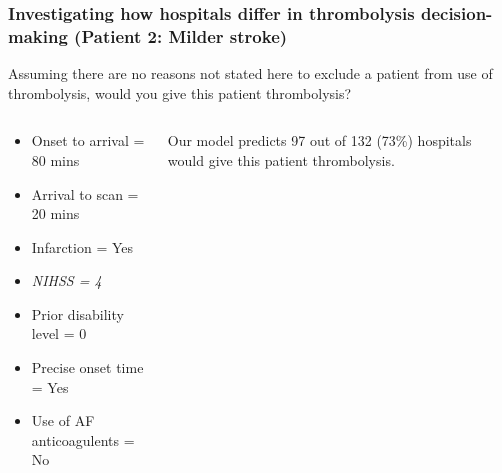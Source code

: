 \documentclass[xcolor={usenames,dvipsnames}]{beamer}
\begin{document}
\begin{frame}
\frametitle{Investigating how hospitals differ in thrombolysis decision-making (Patient 2: Milder stroke)}

Assuming there are no reasons not stated here to exclude a patient from use of thrombolysis, would you give this patient thrombolysis?

\vspace{3mm}

\begin{columns}
    \begin{column}{0.5\textwidth}
        \begin{itemize}
            \item Onset to arrival = 80 mins
            \item Arrival to scan = 20 mins
            \item Infarction = Yes
            \item \emph{NIHSS = 4}
            \item Prior disability level = 0
            \item Precise onset time = Yes
            \item Use of AF anticoagulents = No
        \end{itemize}
    \end{column}
    
    \begin{column}{0.4\textwidth}
    Our model predicts 97 out of 132 (73\%) hospitals would give this patient thrombolysis.
    \end{column}

\end{columns}
\end{frame}

\end{document}
